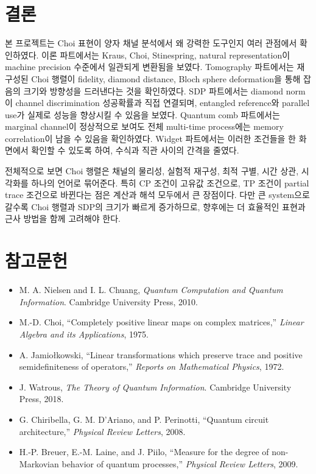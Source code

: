 \documentclass[11pt,a4paper]{article}
\begin{document}
\section{결론}

본 프로젝트는 Choi 표현이 양자 채널 분석에서 왜 강력한 도구인지 여러 관점에서 확인하였다. 이론 파트에서는 Kraus, Choi, Stinespring, natural representation이 machine precision 수준에서 일관되게 변환됨을 보였다. Tomography 파트에서는 재구성된 Choi 행렬이 fidelity, diamond distance, Bloch sphere deformation을 통해 잡음의 크기와 방향성을 드러낸다는 것을 확인하였다. SDP 파트에서는 diamond norm이 channel discrimination 성공확률과 직접 연결되며, entangled reference와 parallel use가 실제로 성능을 향상시킬 수 있음을 보였다. Quantum comb 파트에서는 marginal channel이 정상적으로 보여도 전체 multi-time process에는 memory correlation이 남을 수 있음을 확인하였다. Widget 파트에서는 이러한 조건들을 한 화면에서 확인할 수 있도록 하여, 수식과 직관 사이의 간격을 줄였다.

전체적으로 보면 Choi 행렬은 채널의 물리성, 실험적 재구성, 최적 구별, 시간 상관, 시각화를 하나의 언어로 묶어준다. 특히 CP 조건이 고유값 조건으로, TP 조건이 partial trace 조건으로 바뀐다는 점은 계산과 해석 모두에서 큰 장점이다. 다만 큰 system으로 갈수록 Choi 행렬과 SDP의 크기가 빠르게 증가하므로, 향후에는 더 효율적인 표현과 근사 방법을 함께 고려해야 한다.

\section*{참고문헌}

\begin{itemize}
  \item M. A. Nielsen and I. L. Chuang, \textit{Quantum Computation and Quantum Information}. Cambridge University Press, 2010.
  \item M.-D. Choi, ``Completely positive linear maps on complex matrices,'' \textit{Linear Algebra and its Applications}, 1975.
  \item A. Jamio{\l}kowski, ``Linear transformations which preserve trace and positive semidefiniteness of operators,'' \textit{Reports on Mathematical Physics}, 1972.
  \item J. Watrous, \textit{The Theory of Quantum Information}. Cambridge University Press, 2018.
  \item G. Chiribella, G. M. D'Ariano, and P. Perinotti, ``Quantum circuit architecture,'' \textit{Physical Review Letters}, 2008.
  \item H.-P. Breuer, E.-M. Laine, and J. Piilo, ``Measure for the degree of non-Markovian behavior of quantum processes,'' \textit{Physical Review Letters}, 2009.
\end{itemize}
\end{document}
